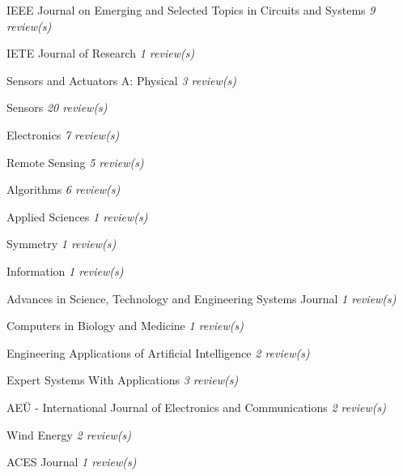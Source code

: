 {\begin{cvitems}
    \item {IEEE Journal on Emerging and Selected Topics in Circuits and Systems \hfill \bodyfontlight\slshape\color{awesome} 9 review(s)}
    \item {IETE Journal of Research \hfill \bodyfontlight\slshape\color{awesome} 1 review(s)}
    \item {Sensors and Actuators A: Physical \hfill \bodyfontlight\slshape\color{awesome} 3 review(s)}
    \item {Sensors \hfill \bodyfontlight\slshape\color{awesome} 20 review(s)}
    \item {Electronics \hfill \bodyfontlight\slshape\color{awesome} 7 review(s)}
    \item {Remote Sensing \hfill \bodyfontlight\slshape\color{awesome} 5 review(s)}
    \item {Algorithms \hfill \bodyfontlight\slshape\color{awesome} 6 review(s)}
    \item {Applied Sciences \hfill \bodyfontlight\slshape\color{awesome} 1 review(s)}
    \item {Symmetry \hfill \bodyfontlight\slshape\color{awesome} 1 review(s)}
    \item {Information \hfill \bodyfontlight\slshape\color{awesome} 1 review(s)}
    \item {Advances in Science, Technology and Engineering Systems Journal \hfill \bodyfontlight\slshape\color{awesome} 1 review(s)}
    \item {Computers in Biology and Medicine \hfill \bodyfontlight\slshape\color{awesome} 1 review(s)}
    \item {Engineering Applications of Artificial Intelligence \hfill \bodyfontlight\slshape\color{awesome} 2 review(s)}
    \item {Expert Systems With Applications \hfill \bodyfontlight\slshape\color{awesome} 3 review(s)}
    \item {AEÜ - International Journal of Electronics and Communications \hfill \bodyfontlight\slshape\color{awesome} 2 review(s)}
    \item {Wind Energy \hfill \bodyfontlight\slshape\color{awesome} 2 review(s)}
    \item {ACES Journal \hfill \bodyfontlight\slshape\color{awesome} 1 review(s)}
    
    \vspace{4.0mm}
\end{cvitems}
}


